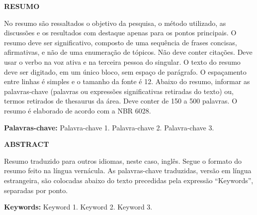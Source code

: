 \documentclass[
	12pt,			%
	oneside,
	a4paper,		%
	english,		%
	brazil,			%
	]{article}
\numberwithin{equation}{section}
\begin{document}
\begin{resumo}\begin{center}
\textbf{RESUMO}
\end{center}
\noindent
No resumo são ressaltados o objetivo da pesquisa, o método utilizado, as discussões e os resultados com destaque apenas para os pontos principais. O resumo deve ser significativo,
composto de uma sequência de frases concisas, afirmativas, e não de uma enumeração de tópicos. Não deve conter citações. Deve usar o verbo na voz ativa e na terceira pessoa do singular. O texto do resumo deve ser digitado, em um único bloco, sem espaço de parágrafo. O espaçamento entre linhas é simples e o tamanho da fonte é 12. Abaixo do resumo, informar as palavras-chave (palavras ou expressões significativas retiradas do texto) ou, termos retirados de thesaurus da área. Deve conter de 150 a 500 palavras. O resumo é elaborado de acordo com a NBR 6028.

\vspace{0.5cm}
\noindent
\textbf{Palavras-chave:} Palavra-chave 1. Palavra-chave 2. Palavra-chave 3.
\thispagestyle{empty}
\end{resumo}
\newpage
\begin{resumo}\begin{center}
\textbf{ABSTRACT}
\end{center}
\noindent
Resumo traduzido para outros idiomas, neste caso, inglês. Segue o formato do resumo feito na língua vernácula. As palavras-chave traduzidas, versão em língua estrangeira, são colocadas abaixo do texto precedidas pela expressão “Keywords”, separadas por ponto.

\vspace{0.5cm}
\noindent
\textbf{Keywords:} Keyword 1. Keyword 2. Keyword 3.
\thispagestyle{empty}
\newpage
\end{resumo}
\renewcommand{\listfigurename}{LISTA DE FIGURAS}
\renewcommand{\listtablename}{LISTA DE TABELAS}
%
{%
\let\oldnumberline\numberline%
\renewcommand{\numberline}{\figurename~\oldnumberline}%
\listoffigures%
}
\thispagestyle{empty}
\newpage
\end{document}
